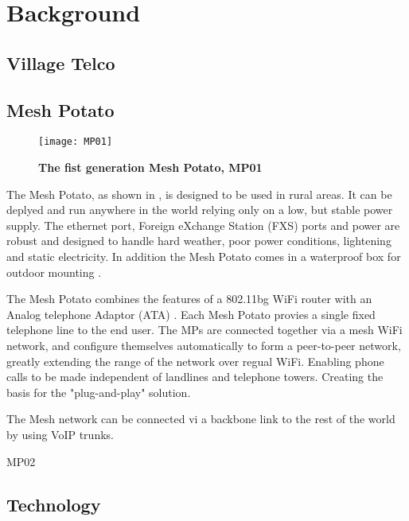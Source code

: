 \chapter{Background}
\label{chp:background} 

\section{Village Telco}

\section{Mesh Potato}


\begin{figure}[h!]
  \centering
      \texttt{[image: MP01]}
  \caption [The Mesh Potato]{\textbf{The fist generation Mesh Potato, MP01}}
  \label{fig:MP01}
\end{figure}

The Mesh Potato, as shown in , is designed to be used in rural areas. It can be deplyed and run anywhere in the world relying only on a low, but stable power supply. The ethernet port, Foreign eXchange Station (FXS) ports and power are robust and designed to handle hard weather, poor power conditions, lightening and static electricity. In addition the Mesh Potato comes in a waterproof box for outdoor mounting \cite{background}.

The Mesh Potato combines the features of a 802.11bg WiFi router with an Analog telephone Adaptor (ATA) \cite{MP}. Each Mesh Potato provies a single fixed telephone line to the end user. The MPs are connected together via a mesh WiFi network, and  configure themselves automatically to form a peer-to-peer network, greatly extending the range of the network over regual WiFi. Enabling phone calls to be made independent of landlines and telephone towers. Creating the basis for the "plug-and-play" solution. 








The Mesh network can be connected vi a backbone link to the rest of the world by using VoIP trunks. 


MP02





\section{Technology}

